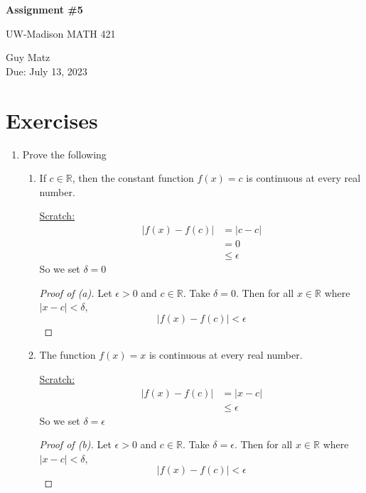 \documentclass{article} %
\theoremstyle{plain}
\theoremstyle{definition}
\theoremstyle{case}
\newcommand{\Rb}{\mathbb{R}}
\begin{document}
\begin{center}
\Large{\textbf{Assignment \#5}
            
UW-Madison MATH 421} %
\vspace{5pt}
        
\normalsize{  Guy Matz%
        \\ Due: July 13, 2023}
\vspace{15pt}
\end{center}

\section*{Exercises}%
\begin{enumerate}[label={\fbox{\textbf{Exercise \#\arabic* :}}}]

  \item Prove the following
    \begin{enumerate}
      \item If $c \in \Rb$, then the constant function $f(x) =c$ is continuous at every real number.

        \underline{Scratch:}
          \begin{align*}
            |f(x) - f(c)| &= |c - c| \\
                          &= 0 \\
                          &\leq \epsilon
          \end{align*}
           So we set $\delta = 0$
        \begin{proof}[Proof of (a)]

          Let $\epsilon>0$ and $c \in \mathbb{R}$.  Take $\delta = 0$.
          Then for all $x \in \mathbb{R}$ where $|x-c| < \delta$,
            \[ |f(x) - f(c)| < \epsilon \]

        \end{proof}
      \item The function $f(x) = x$ is continuous at every real number.

        \underline{Scratch:}
          \begin{align*}
            |f(x) - f(c)| &= |x - c| \\
                          &\leq \epsilon
          \end{align*}
          So we set $\delta = \epsilon$
        \begin{proof}[Proof of (b)]
          Let $\epsilon>0$ and $c \in \mathbb{R}$.  Take $\delta = \epsilon$.
          Then for all $x \in \mathbb{R}$ where $|x-c| < \delta$,
            \[ |f(x) - f(c)| < \epsilon \]


\end{proof}
\end{enumerate}
\end{enumerate}
\end{document}
